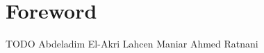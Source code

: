 \clearpage
\section*{Foreword}
TODO
%
\noindent Abdeladim El-Akri 
\noindent Lahcen Maniar 
\noindent Ahmed Ratnani 

